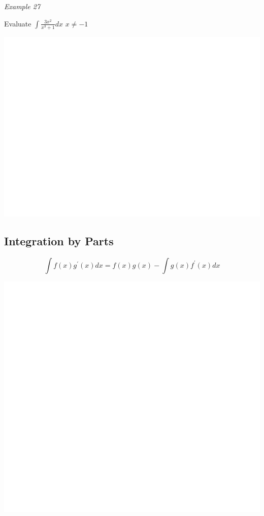 \documentclass[]{book}
\begin{document}
\emph{Example 27}

Evaluate \(\int \frac{3x^2}{x^3+1} dx\) \(x\neq -1\)

\begin{center}\includegraphics[width=1\linewidth]{figure/LB46-1} \end{center}

\hypertarget{integration-by-parts}{%
\subsection{Integration by Parts}\label{integration-by-parts}}

\[\int f(x) g^\prime(x)dx=f(x)g(x)-\int g(x)f^\prime(x)dx\]

\begin{center}\includegraphics[width=1\linewidth]{figure/LB46b-1} \end{center}
\end{document}
